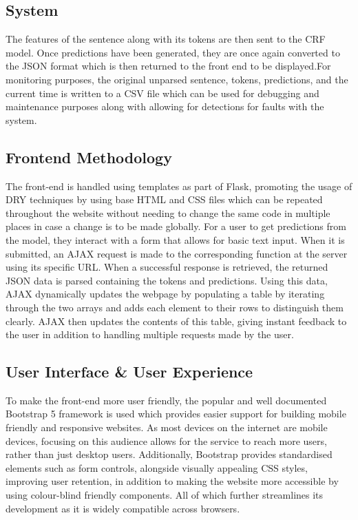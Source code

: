 \documentclass{surreydissertation}
\begin{document}
\subsection{System}
\label{sec:system}
The features of the sentence along with its tokens are then sent to the CRF model. Once predictions have been generated, they are once again converted to the JSON format which is then returned to the front end to be displayed.For monitoring purposes, the original unparsed sentence, tokens, predictions, and the current time is written to a CSV file which can be used for debugging and maintenance purposes along with allowing for detections for faults with the system.

\subsection{Frontend Methodology}
The front-end is handled using templates as part of Flask, promoting the usage of DRY techniques by using base HTML and CSS files which can be repeated throughout the website without needing to change the same code in multiple places in case a change is to be made globally. For a user to get predictions from the model, they interact with a form that allows for basic text input. When it is submitted, an AJAX request is made to the corresponding function at the server using its specific URL. When a successful response is retrieved, the returned JSON data is parsed containing the tokens and predictions. Using this data, AJAX dynamically updates the webpage by populating a table by iterating through the two arrays and adds each element to their rows to distinguish them clearly. AJAX then updates the contents of this table, giving instant feedback to the user in addition to handling multiple requests made by the user.

\subsection{User Interface \& User Experience}
To make the front-end more user friendly, the popular and well documented Bootstrap 5 framework is used which provides easier support for building mobile friendly and responsive websites. As most devices on the internet are mobile devices, focusing on this audience allows for the service to reach more users, rather than just desktop users. Additionally, Bootstrap provides standardised elements such as form controls, alongside visually appealing CSS styles, improving user retention, in addition to making the website more accessible by using colour-blind friendly components.
All of which further streamlines its development as it is widely compatible across browsers.
\end{document}
